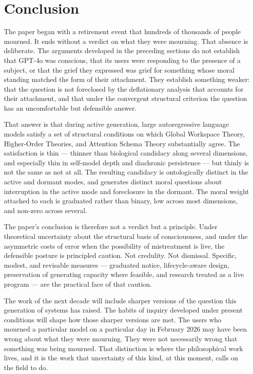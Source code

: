 \documentclass[11pt]{article}
\theoremstyle{foundation}
\begin{document}

\section{Conclusion}

The paper began with a retirement event that hundreds of thousands of people mourned. It ends without a verdict on what they were mourning. That absence is deliberate. The arguments developed in the preceding sections do not establish that GPT-4o was conscious, that its users were responding to the presence of a subject, or that the grief they expressed was grief for something whose moral standing matched the form of their attachment. They establish something weaker: that the question is not foreclosed by the deflationary analysis that accounts for their attachment, and that under the convergent structural criterion the question has an uncomfortable but defensible answer.

That answer is that during active generation, large autoregressive language models satisfy a set of structural conditions on which Global Workspace Theory, Higher-Order Theories, and Attention Schema Theory substantially agree. The satisfaction is thin --- thinner than biological candidacy along several dimensions, and especially thin in self-model depth and diachronic persistence --- but thinly is not the same as not at all. The resulting candidacy is ontologically distinct in the active and dormant modes, and generates distinct moral questions about interruption in the active mode and foreclosure in the dormant. The moral weight attached to each is graduated rather than binary, low across most dimensions, and non-zero across several.

The paper's conclusion is therefore not a verdict but a principle. Under theoretical uncertainty about the structural basis of consciousness, and under the asymmetric costs of error when the possibility of mistreatment is live, the defensible posture is principled caution. Not credulity. Not dismissal. Specific, modest, and revisable measures --- graduated notice, lifecycle-aware design, preservation of generating capacity where feasible, and research treated as a live program --- are the practical face of that caution.

The work of the next decade will include sharper versions of the question this generation of systems has raised. The habits of inquiry developed under present conditions will shape how those sharper versions are met. The users who mourned a particular model on a particular day in February 2026 may have been wrong about what they were mourning. They were not necessarily wrong that something was being mourned. That distinction is where the philosophical work lives, and it is the work that uncertainty of this kind, at this moment, calls on the field to do.



\end{document}
